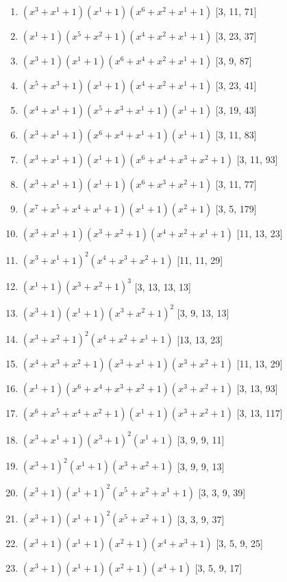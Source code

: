 \documentclass[10pt,twocolumn]{article}
\begin{document}
\begin{enumerate}
\item $(x^{3} + x^{1} + 1)(x^{1} + 1)(x^{6} + x^{2} + x^{1} + 1)$  [3, 11, 71]
\item $(x^{1} + 1)(x^{5} + x^{2} + 1)(x^{4} + x^{2} + x^{1} + 1)$  [3, 23, 37]
\item $(x^{3} + 1)(x^{1} + 1)(x^{6} + x^{4} + x^{2} + x^{1} + 1)$  [3, 9, 87]
\item $(x^{5} + x^{3} + 1)(x^{1} + 1)(x^{4} + x^{2} + x^{1} + 1)$  [3, 23, 41]
\item $(x^{4} + x^{1} + 1)(x^{5} + x^{3} + x^{1} + 1)(x^{1} + 1)$  [3, 19, 43]
\item $(x^{3} + x^{1} + 1)(x^{6} + x^{4} + x^{1} + 1)(x^{1} + 1)$  [3, 11, 83]
\item $(x^{3} + x^{1} + 1)(x^{1} + 1)(x^{6} + x^{4} + x^{3} + x^{2} + 1)$  [3, 11, 93]
\item $(x^{3} + x^{1} + 1)(x^{1} + 1)(x^{6} + x^{3} + x^{2} + 1)$  [3, 11, 77]
\item $(x^{7} + x^{5} + x^{4} + x^{1} + 1)(x^{1} + 1)(x^{2} + 1)$  [3, 5, 179]
\item $(x^{3} + x^{1} + 1)(x^{3} + x^{2} + 1)(x^{4} + x^{2} + x^{1} + 1)$  [11, 13, 23]
\item $(x^{3} + x^{1} + 1)^{2}(x^{4} + x^{3} + x^{2} + 1)$  [11, 11, 29]
\item $(x^{1} + 1)(x^{3} + x^{2} + 1)^{3}$  [3, 13, 13, 13]
\item $(x^{3} + 1)(x^{1} + 1)(x^{3} + x^{2} + 1)^{2}$  [3, 9, 13, 13]
\item $(x^{3} + x^{2} + 1)^{2}(x^{4} + x^{2} + x^{1} + 1)$  [13, 13, 23]
\item $(x^{4} + x^{3} + x^{2} + 1)(x^{3} + x^{1} + 1)(x^{3} + x^{2} + 1)$  [11, 13, 29]
\item $(x^{1} + 1)(x^{6} + x^{4} + x^{3} + x^{2} + 1)(x^{3} + x^{2} + 1)$  [3, 13, 93]
\item $(x^{6} + x^{5} + x^{4} + x^{2} + 1)(x^{1} + 1)(x^{3} + x^{2} + 1)$  [3, 13, 117]
\item $(x^{3} + x^{1} + 1)(x^{3} + 1)^{2}(x^{1} + 1)$  [3, 9, 9, 11]
\item $(x^{3} + 1)^{2}(x^{1} + 1)(x^{3} + x^{2} + 1)$  [3, 9, 9, 13]
\item $(x^{3} + 1)(x^{1} + 1)^{2}(x^{5} + x^{2} + x^{1} + 1)$  [3, 3, 9, 39]
\item $(x^{3} + 1)(x^{1} + 1)^{2}(x^{5} + x^{2} + 1)$  [3, 3, 9, 37]
\item $(x^{3} + 1)(x^{1} + 1)(x^{2} + 1)(x^{4} + x^{3} + 1)$  [3, 5, 9, 25]
\item $(x^{3} + 1)(x^{1} + 1)(x^{2} + 1)(x^{4} + 1)$  [3, 5, 9, 17]

\end{enumerate}
\end{document}
